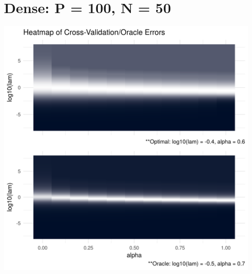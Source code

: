 \documentclass[11pt,]{book}
\theoremstyle{definition}
\theoremstyle{definition}
\theoremstyle{definition}
\theoremstyle{remark}
\begin{document}
\hypertarget{dense-p-100-n-50}{%
\section{Dense: P = 100, N = 50}\label{dense-p-100-n-50}}

\includegraphics{images/repsKLdenseQR_N50_P100.png}

\vspace{0.5cm}
\end{document}
